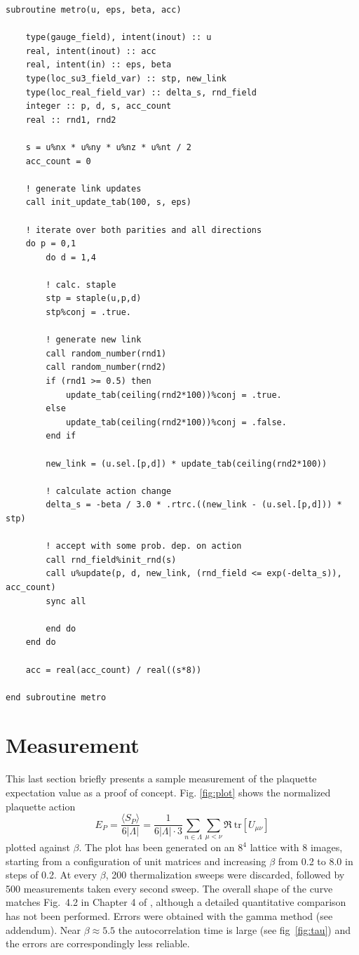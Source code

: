 \documentclass[graybox]{svmult}
\begin{document}
\begin{lstlisting}[caption={Metro subroutine running one sweep for both parities and each direction}]
subroutine metro(u, eps, beta, acc)

    type(gauge_field), intent(inout) :: u
	real, intent(inout) :: acc
	real, intent(in) :: eps, beta
	type(loc_su3_field_var) :: stp, new_link
	type(loc_real_field_var) :: delta_s, rnd_field
	integer :: p, d, s, acc_count
	real :: rnd1, rnd2
	
	s = u%nx * u%ny * u%nz * u%nt / 2
	acc_count = 0
	
	! generate link updates
	call init_update_tab(100, s, eps)

    ! iterate over both parities and all directions
    do p = 0,1
        do d = 1,4

        ! calc. staple
        stp = staple(u,p,d)
        stp%conj = .true.

        ! generate new link
        call random_number(rnd1)
        call random_number(rnd2)
        if (rnd1 >= 0.5) then
            update_tab(ceiling(rnd2*100))%conj = .true.
        else
            update_tab(ceiling(rnd2*100))%conj = .false.
        end if

        new_link = (u.sel.[p,d]) * update_tab(ceiling(rnd2*100))

        ! calculate action change
        delta_s = -beta / 3.0 * .rtrc.((new_link - (u.sel.[p,d])) * stp)

        ! accept with some prob. dep. on action
        call rnd_field%init_rnd(s)
        call u%update(p, d, new_link, (rnd_field <= exp(-delta_s)), acc_count)
        sync all

        end do
    end do

    acc = real(acc_count) / real((s*8))

end subroutine metro
\end{lstlisting}

\section{Measurement}
\label{sec:meas}

This last section briefly presents a sample measurement of the plaquette expectation value as a proof of concept. Fig. \ref{fig:plot} shows the normalized plaquette action
\begin{equation}
E_P = \frac{\langle S_P \rangle} {6|\Lambda|} = \frac{1} {6|\Lambda| \cdot 3} \sum_{n \in \Lambda} \sum_{\mu < \nu} \Re\ \text{tr} [U_{\mu\nu}]
\end{equation}
plotted against $\beta$. The plot has been generated on an $8^4$ lattice with 8 images, starting from a configuration of unit matrices and increasing $\beta$ from 0.2 to 8.0 in steps of 0.2. At every $\beta$, 200 thermalization sweeps were discarded, followed by 500 measurements taken every second sweep. The overall shape of the curve matches Fig.~4.2 in Chapter 4 of \cite{gattringer}, although a detailed quantitative comparison has not been performed. Errors were obtained with the gamma method \cite{wolff2004} (see addendum). Near $\beta \approx 5.5$ the autocorrelation time is large (see fig~\ref{fig:tau}) and the errors are correspondingly less reliable.
\end{document}
